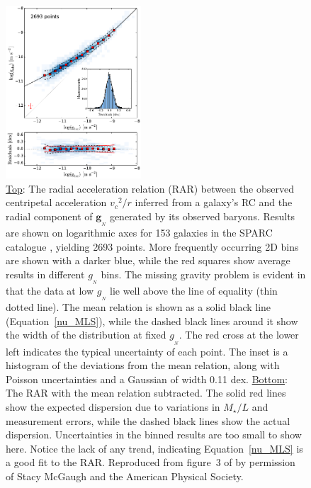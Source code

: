 \documentclass[fleqn,usenatbib,useAMS]{mnras} %
\begin{document}
\begin{figure}
	\centering
	\includegraphics[width=0.45\textwidth]{MLS_16_Figure_3}
	\caption{\underline{Top}: The radial acceleration relation (RAR) between the observed centripetal acceleration ${v_c}^2/r$ inferred from a galaxy's RC and the radial component of $\bm{g}_{_N}$ generated by its observed baryons. Results are shown on logarithmic axes for 153 galaxies in the SPARC catalogue \citep{SPARC}, yielding 2693 points. More frequently occurring 2D bins are shown with a darker blue, while the red squares show average results in different $g_{_N}$ bins. The missing gravity problem is evident in that the data at low $g_{_N}$ lie well above the line of equality (thin dotted line). The mean relation is shown as a solid black line (Equation~\ref{nu_MLS}), while the dashed black lines around it show the width of the distribution at fixed $g_{_N}$. The red cross at the lower left indicates the typical uncertainty of each point. The inset is a histogram of the deviations from the mean relation, along with Poisson uncertainties and a Gaussian of width 0.11 dex. \underline{Bottom}: The RAR with the mean relation subtracted. The solid red lines show the expected dispersion due to variations in $M_{\star}/L$ and measurement errors, while the dashed black lines show the actual dispersion. Uncertainties in the binned results are too small to show here. Notice the lack of any trend, indicating Equation~\ref{nu_MLS} is a good fit to the RAR. Reproduced from figure~3 of \citet{McGaugh_Lelli_2016} by permission of Stacy McGaugh and the American Physical Society.}
	\label{MLS_16_Figure_3}
\end{figure}
\end{document}
